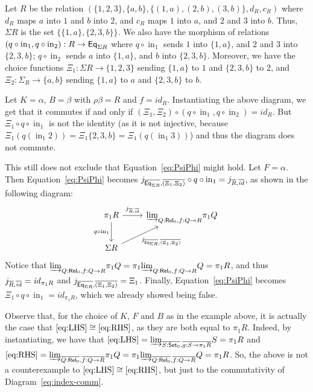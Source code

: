 \documentclass{lmcs}
\theoremstyle{plain}\newtheorem{satz}[thm]{Satz}
\newcommand{\set}{\mathsf{Set}}
\renewcommand{\id}{\mathit{id}}
\DeclareMathOperator{\SumIn}{in}
\begin{document}
\begin{exa}
Let $R$ be the relation $(\{ 1, 2, 3\}, \{a, b\}, \{(1, a), (2, b), (3, b)\}, d_R, c_R)$ where $d_R$ maps $a$ into $1$ and $b$ into $2$, and $c_R$ maps $1$ into $a$, and $2$ and $3$ into $b$.
Thus, $\Sigma{R}$ is the set $\{ \{1, a\}, \{2, 3, b\} \}$.
We also have the morphism of relations $(q \circ \SumIn_1, q \circ \SumIn_2) : R \to \Eq_{\Sigma{R}}$ where $q \circ \SumIn_1$ sends $1$ into $\{1, a\}$, and $2$ and $3$ into $\{2, 3, b\}$; $q \circ \SumIn_2$ sends $a$ into $\{1, a\}$, and $b$ into $\{2, 3, b\}$.
Moreover, we have the choice functions $\Xi_1 : \Sigma R \to \{ 1, 2, 3\}$ sending $\{1, a\}$ to $1$ and $\{2, 3, b\}$ to $2$, and $\Xi_2 : \Sigma_R \to \{a, b\}$ sending $\{1, a\}$ to $a$ and $\{2, 3, b\}$ to $b$.

Let $K = \alpha$, $B = \beta$ with $\rho \beta = R$ and $f = \id_R$.
Instantiating the above diagram, we get that it commutes if and only if $(\Xi_1, \Xi_2) \circ (q \circ \SumIn_1, q \circ \SumIn_2) = \id_R$.
But $\Xi_1 \circ q \circ \SumIn_1$ is not the identity (as it is not injective, because $\Xi_1 ( q ( \SumIn_1 2 ) ) = \Xi_1 \{ 2, 3, b \} = \Xi_1 ( q ( \SumIn_1 3 ) )$) and thus the diagram does not commute.

This still does not exclude that Equation~\eqref{eq:PsiPhi} might hold.
Let $F = \alpha$.
Then Equation~\eqref{eq:PsiPhi} becomes $j_{\ol{\Eq_{\Sigma{R}}}, \ol{(\Xi_1, \Xi_2)}} \circ q \circ \SumIn_1 = j_{\ol{R}, \ol{\id}}$, as shown in the following diagram:
\[
\begin{tikzcd}
\pi_1 R
\ar[r, "{j_{\ol{R}, \ol{\id}}}"]
\ar[d, "{q \circ \SumIn_1}"']
&\colim{Q: \rel_0, f: Q \to R}{\pi_1 Q} \\
\Sigma{R}
\ar[ur, "{j_{\ol{\Eq_{\Sigma{R}}}, \ol{(\Xi_1, \Xi_2)}}}"']
\end{tikzcd}
\]
Notice that ${{\underrightarrow{\lim}}_{Q: \mathsf{Rel}_0, f: Q \to R}{\pi_1 Q}} = \pi_1 {{\underrightarrow{\lim}}_{Q: \mathsf{Rel}_0, f: Q \to R}{Q}} = \pi_1 R$, and thus $j_{\ol{R}, \ol{\id}} = \id_{\pi_1 R}$ and $j_{\overline{\mathsf{Eq}_{\Sigma{R}}}, \overline{(\Xi_1, \Xi_2)}} = \Xi_1$.
Finally, Equation~\eqref{eq:PsiPhi} becomes $\Xi_1 \circ q \circ \SumIn_1 = \id_{\pi_1 R}$, which we already showed being false.
\end{exa}

Observe that, for the choice of $K$, $F$ and $B$ as in the example above, it is actually the case that $\eqref{eq:LHS} \cong \eqref{eq:RHS}$, as they are both equal to $\pi_1 R$.
Indeed, by instantiating, we have that $\eqref{eq:LHS} = \colim{\ol{S : \set_0}, \ol{g : S \to \pi_1 R}}{S} = \pi_1 R$ and
$\eqref{eq:RHS} = {{\underrightarrow{\lim}}_{\overline{Q : \mathsf{Rel}_0}, \overline{f : Q \to R}}{\pi_1 Q}} = \pi_1 {{\underrightarrow{\lim}}_{\overline{Q : \mathsf{Rel}_0}, \overline{f : Q \to R}}{Q}} = \pi_1 R$.
So, the above is not a counterexample to $\eqref{eq:LHS} \cong \eqref{eq:RHS}$, but just to the commutativity of Diagram~\ref{eq:index-comm}.





  
\end{document}
